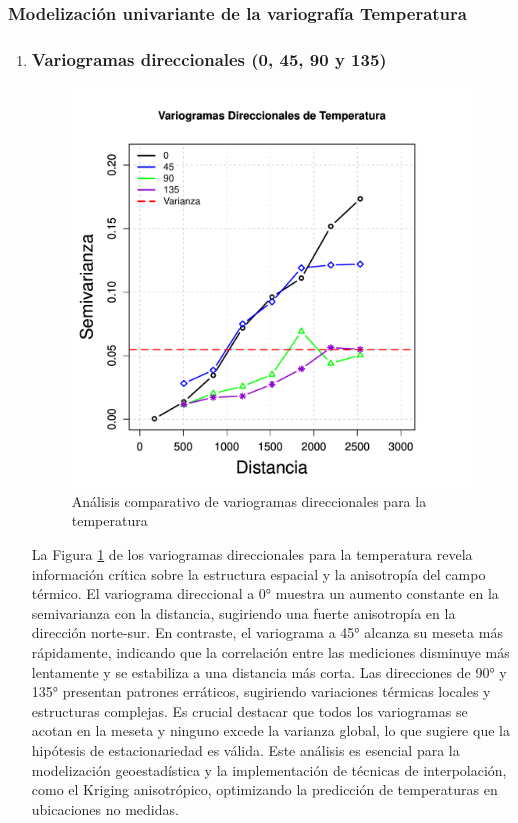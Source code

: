 \subsubsection{Modelización univariante de la variografía Temperatura }
\begin{enumerate}
    \item \subsubsection{Variogramas direccionales (0, 45, 90 y 135)}


\begin{figure}[H]
    \centering
    \includegraphics[width=0.8\linewidth]{Figuras_AED//VARIOGRAFICO/tem_Vario4DEstimation.pdf}
    \caption{Análisis comparativo de variogramas direccionales para la temperatura}

    \label{fig:enter-labelter}
\end{figure}

La Figura \ref{fig:enter-labelter} de los variogramas direccionales para la temperatura revela información crítica sobre la estructura espacial y la anisotropía del campo térmico. El variograma direccional a 0° muestra un aumento constante en la semivarianza con la distancia, sugiriendo una fuerte anisotropía en la dirección norte-sur. En contraste, el variograma a 45° alcanza su meseta más rápidamente, indicando que la correlación entre las mediciones disminuye más lentamente y se estabiliza a una distancia más corta. Las direcciones de 90° y 135° presentan patrones erráticos, sugiriendo variaciones térmicas locales y estructuras complejas. Es crucial destacar que todos los variogramas se acotan en la meseta y ninguno excede la varianza global, lo que sugiere que la hipótesis de estacionariedad es válida. Este análisis es esencial para la modelización geoestadística y la implementación de técnicas de interpolación, como el Kriging anisotrópico, optimizando la predicción de temperaturas en ubicaciones no medidas.



\end{enumerate}
